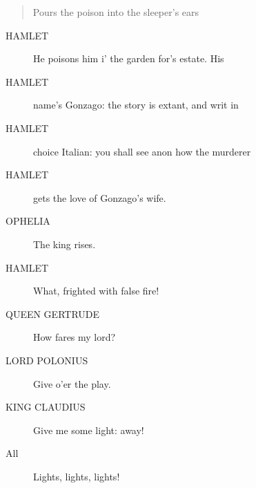 \documentclass{article}
\begin{document}
\begin{quote}
Pours the poison into the sleeper's ears
\end{quote}
          
\begin{description}
            
\item[HAMLET] He poisons him i' the garden for's estate. His
\item[HAMLET] name's Gonzago: the story is extant, and writ in
\item[HAMLET] choice Italian: you shall see anon how the murderer
\item[HAMLET] gets the love of Gonzago's wife.
\end{description}
          
\begin{description}
            
\item[OPHELIA] The king rises.
\end{description}
          
\begin{description}
            
\item[HAMLET] What, frighted with false fire!
\end{description}
          
\begin{description}
            
\item[QUEEN GERTRUDE] How fares my lord?
\end{description}
          
\begin{description}
            
\item[LORD POLONIUS] Give o'er the play.
\end{description}
          
\begin{description}
            
\item[KING CLAUDIUS] Give me some light: away!
\end{description}
          
\begin{description}
            
\item[All] Lights, lights, lights!
\end{description}
          
\end{document}
